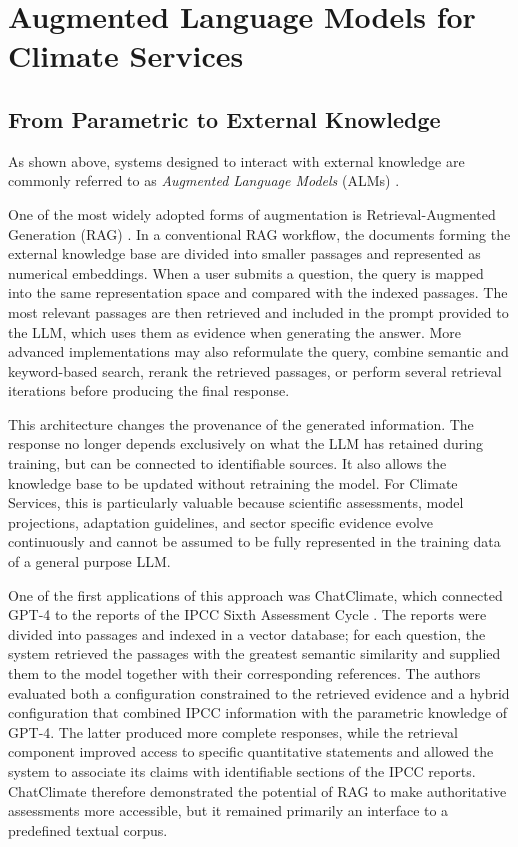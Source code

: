 \section{Augmented Language Models for Climate Services}

\subsection{From Parametric to External Knowledge}

As shown above, systems designed to interact with external knowledge are commonly referred to as \emph{Augmented Language Models} (ALMs) \citep{mialon_augmented_2023}. 

One of the most widely adopted forms of augmentation is Retrieval-Augmented Generation (RAG) \citep{lewis_retrieval-augmented_2020,gao_retrieval-augmented_2024}. In a conventional RAG workflow, the documents forming the external knowledge base are divided into smaller passages and represented as numerical embeddings. When a user submits a question, the query is mapped into the same representation space and compared with the indexed passages. The most relevant passages are then retrieved and included in the prompt provided to the LLM, which uses them as evidence when generating the answer. More advanced implementations may also reformulate the query, combine semantic and keyword-based search, rerank the retrieved passages, or perform several retrieval iterations before producing the final response.

This architecture changes the provenance of the generated information. The response no longer depends exclusively on what the LLM has retained during training, but can be connected to identifiable sources. It also allows the knowledge base to be updated without retraining the model. For Climate Services, this is particularly valuable because scientific assessments, model projections, adaptation guidelines, and sector specific evidence evolve continuously and cannot be assumed to be fully represented in the training data of a general purpose LLM.

One of the first applications of this approach was ChatClimate, which connected GPT-4 to the reports of the IPCC Sixth Assessment Cycle \citep{vaghefi_chatclimate_2023}. The reports were divided into passages and indexed in a vector database; for each question, the system retrieved the passages with the greatest semantic similarity and supplied them to the model together with their corresponding references. The authors evaluated both a configuration constrained to the retrieved evidence and a hybrid configuration that combined IPCC information with the parametric knowledge of GPT-4. The latter produced more complete responses, while the retrieval component improved access to specific quantitative statements and allowed the system to associate its claims with identifiable sections of the IPCC reports. ChatClimate therefore demonstrated the potential of RAG to make authoritative assessments more accessible, but it remained primarily an interface to a predefined textual corpus.

